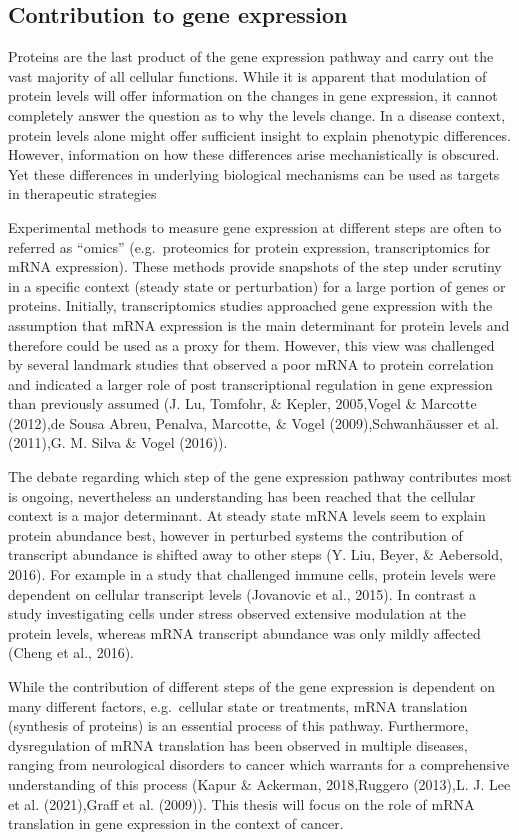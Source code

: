 \documentclass[12pt,openany]{book}
\begin{document}
\subsection{Contribution to gene expression} Proteins are the last
product of the gene expression pathway and carry out the vast majority
of all cellular functions. While it is apparent that modulation of
protein levels will offer information on the changes in gene expression,
it cannot completely answer the question as to why the levels change. In
a disease context, protein levels alone might offer sufficient insight
to explain phenotypic differences. However, information on how these
differences arise mechanistically is obscured. Yet these differences in
underlying biological mechanisms can be used as targets in therapeutic
strategies

Experimental methods to measure gene expression at different steps are
often to referred as ``omics'' (e.g.~proteomics for protein expression,
transcriptomics for mRNA expression). These methods provide snapshots of
the step under scrutiny in a specific context (steady state or
perturbation) for a large portion of genes or proteins. Initially,
transcriptomics studies approached gene expression with the assumption
that mRNA expression is the main determinant for protein levels and
therefore could be used as a proxy for them. However, this view was
challenged by several landmark studies that observed a poor mRNA to
protein correlation and indicated a larger role of post transcriptional
regulation in gene expression than previously assumed (J. Lu, Tomfohr,
\& Kepler, 2005,Vogel \& Marcotte (2012),de Sousa Abreu, Penalva,
Marcotte, \& Vogel (2009),Schwanhäusser et al. (2011),G. M. Silva \&
Vogel (2016)).

The debate regarding which step of the gene expression pathway
contributes most is ongoing, nevertheless an understanding has been
reached that the cellular context is a major determinant. At steady
state mRNA levels seem to explain protein abundance best, however in
perturbed systems the contribution of transcript abundance is shifted
away to other steps (Y. Liu, Beyer, \& Aebersold, 2016). For example in
a study that challenged immune cells, protein levels were dependent on
cellular transcript levels (Jovanovic et al., 2015). In contrast a study
investigating cells under stress observed extensive modulation at the
protein levels, whereas mRNA transcript abundance was only mildly
affected (Cheng et al., 2016).

While the contribution of different steps of the gene expression is
dependent on many different factors, e.g.~cellular state or treatments,
mRNA translation (synthesis of proteins) is an essential process of this
pathway. Furthermore, dysregulation of mRNA translation has been
observed in multiple diseases, ranging from neurological disorders to
cancer which warrants for a comprehensive understanding of this process
(Kapur \& Ackerman, 2018,Ruggero (2013),L. J. Lee et al. (2021),Graff et
al. (2009)). This thesis will focus on the role of mRNA translation in
gene expression in the context of cancer. \newline
\end{document}
